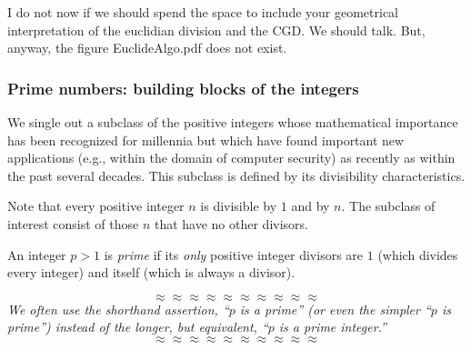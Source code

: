 {\Arny I do not now if we should spend the space to include your
  geometrical interpretation of the euclidian division and the CGD.
  We should talk.  But, anyway, the figure EuclideAlgo.pdf does not exist.}



\subsubsection{Prime numbers: building blocks of the integers}
\label{sec:primes}

We single out a subclass of the positive integers whose mathematical
importance has been recognized for millennia but which have found
important new applications (e.g., within the domain of computer
security) as recently as within the past several decades.  This
subclass is defined by its divisibility characteristics.

Note that every positive integer $n$ is divisible by $1$ and by $n$.
The subclass of interest consist of those $n$ that have no other
divisors.

An integer $p >1$ is {\it prime}
if its {\em only} positive integer divisors are $1$ (which divides
every integer) and itself (which is always a divisor).

\[ \approx \approx \approx \approx \approx \approx \approx \approx \approx \approx \]
{\em We often use the shorthand assertion, ``$p$ is a prime'' (or even
  the simpler ``$p$ is prime'') instead of the longer, but equivalent,
  ``$p$ is a prime integer.''}
\[ \approx \approx \approx \approx \approx \approx \approx \approx \approx \approx \]

